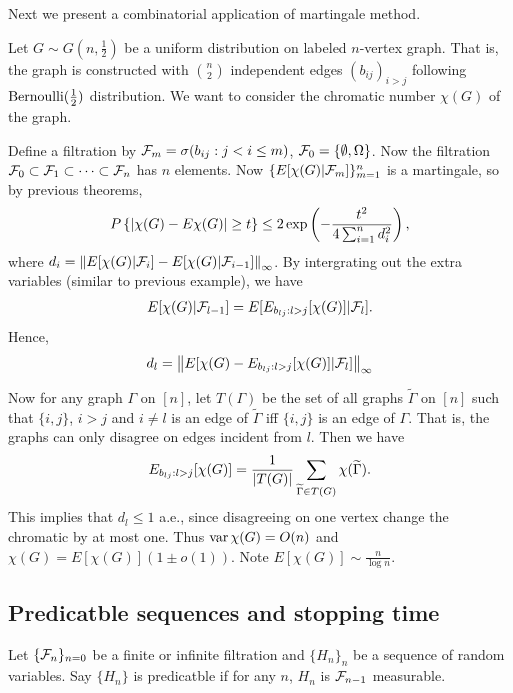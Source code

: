 \documentclass[a4paper]{article}
\begin{document}
Next we present a combinatorial application of martingale method.
\begin{eg}
  Let $G \sim G(n, \frac{1}{2})$ be a uniform distribution on labeled 
  $n$-vertex graph. That is, the graph is constructed with 
  $\binom{n}{2}$ independent edges $(b_{ij})_{i > j}$ following 
  $\operatorname{Bernoulli}(\frac{1}{2})$ distribution. 
  We want to consider the chromatic number $\chi (G)$ of the graph.

  Define a filtration by $\mathcal{F}_m = \sigma(b_{ij}: j < i \leq m)$, 
  $\mathcal{F}_0 = \{ \emptyset, \Omega \}$. Now the filtration 
  $\mathcal{F}_0 \subset \mathcal{F}_1 \subset \cdots \subset \mathcal{F}_n$ has 
  $n$ elements. Now $\{ E[\chi(G) | \mathcal{F}_m] \}_{m=1}^n$ is a martingale,
  so by previous theorems, 
  \[
  P \left\{ \left\lvert \chi (G) - E \chi(G)\right\rvert \geq t \right\}
  \leq 2 \exp \left(  - \frac{t^2}{4 \sum_{i=1}^n d_i^2} \right),
  \]
  where $d_i = \left\lVert E [\chi(G) | \mathcal{F}_i] - E [\chi(G) | \mathcal{F}_{i - 1}]\right\rVert_\infty$.
  By intergrating out the extra variables (similar to previous 
  example), we have
  \begin{align*}
    E[\chi(G) | \mathcal{F}_{l - 1}] = E[E_{b_{lj} : l > j} [\chi(G)] | \mathcal{F}_l].
  \end{align*}
  Hence, 
  \[
  d_l = \left\lVert E [\chi(G) -  E_{b_{lj} : l > j} [\chi(G)] | \mathcal{F}_l]\right\rVert_\infty
  \]

  Now for any graph $\Gamma$ on $[n]$, let $T(\Gamma)$ be the set of all 
  graphs $\tilde{\Gamma}$ on $[n]$ such that $\{i, j\}$, $i > j$ and 
  $i \neq l$ is an edge of $\tilde{\Gamma}$ iff $\{i, j\}$ is 
  an edge of $\Gamma$. That is, the graphs can only disagree on edges 
  incident from $l$. Then we have 
  \[
  E_{b_{lj} : l > j} [\chi(G)] = \frac{1}{\left\lvert T(G)\right\rvert} \sum_{\widetilde{\Gamma}
  \in T(G)} \chi (\widetilde{\Gamma}).
  \]
  This implies that $d_l \leq 1$ a.e., since disagreeing on 
  one vertex change the chromatic by at most one. Thus $\operatorname{var} \chi(G) = O(n)$
  and $\chi(G) = E [\chi(G)] (1 \pm o(1))$. Note $E [\chi(G)] \sim 
  \frac{n}{\log n}$.

\end{eg}

\subsection{Predicatble sequences and stopping time}

\begin{defi}
  Let $\{ \mathcal{F}_n \}_{n = 0}$ be a finite or infinite filtration 
  and $\{ H_n \}_n$ be a sequence of random variables. 
  Say $\{ H_n \}$ is predicatble if for any $n$, 
  $H_n$ is $\mathcal{F}_{n - 1}$ measurable.
\end{defi}
\end{document}

